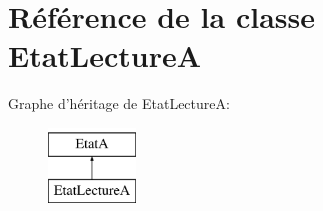 \hypertarget{classEtatLectureA}{\section{Référence de la classe Etat\+Lecture\+A}
\label{classEtatLectureA}
}
Graphe d'héritage de Etat\+Lecture\+A\+:\begin{figure}[H]
\begin{center}
\leavevmode
\includegraphics[height=2.000000cm]{classEtatLectureA}
\end{center}
\end{figure}
